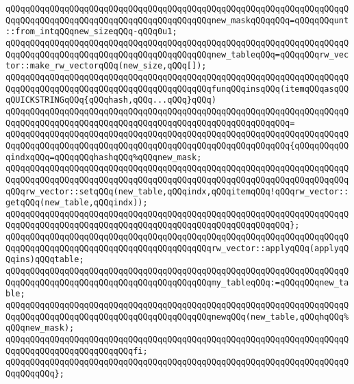 \verb|qQQqqQQqqQQqqQQqqQQqqQQqqQQqqQQqqQQqqQQqqQQqqQQqqQQqqQQqqQQqqQQqqQQqqQQqqQQqqQQqqQQqqQQqqQQqqQQqqQQqqQQqqQQqqQQqnew_maskqQQqqQQq=qQQqqQQqunt::from_intqQQqnew_sizeqQQq-qQQq0u1;|\newline
\verb|qQQqqQQqqQQqqQQqqQQqqQQqqQQqqQQqqQQqqQQqqQQqqQQqqQQqqQQqqQQqqQQqqQQqqQQqqQQqqQQqqQQqqQQqqQQqqQQqqQQqqQQqqQQqqQQqnew_tableqQQq=qQQqqQQqrw_vector::make_rw_vectorqQQq(new_size,qQQq[]);|\newline
\newline
\verb|qQQqqQQqqQQqqQQqqQQqqQQqqQQqqQQqqQQqqQQqqQQqqQQqqQQqqQQqqQQqqQQqqQQqqQQqqQQqqQQqqQQqqQQqqQQqqQQqqQQqqQQqqQQqqQQqfunqQQqinsqQQq(itemqQQqasqQQqQUICKSTRINGqQQq{qQQqhash,qQQq...qQQq}qQQq)|\newline
\verb|qQQqqQQqqQQqqQQqqQQqqQQqqQQqqQQqqQQqqQQqqQQqqQQqqQQqqQQqqQQqqQQqqQQqqQQqqQQqqQQqqQQqqQQqqQQqqQQqqQQqqQQqqQQqqQQqqQQqqQQqqQQqqQQq=|\newline
\verb|qQQqqQQqqQQqqQQqqQQqqQQqqQQqqQQqqQQqqQQqqQQqqQQqqQQqqQQqqQQqqQQqqQQqqQQqqQQqqQQqqQQqqQQqqQQqqQQqqQQqqQQqqQQqqQQqqQQqqQQqqQQqqQQq{qQQqqQQqqQQqindxqQQq=qQQqqQQqhashqQQq%qQQqnew_mask;|\newline
\newline
\verb|qQQqqQQqqQQqqQQqqQQqqQQqqQQqqQQqqQQqqQQqqQQqqQQqqQQqqQQqqQQqqQQqqQQqqQQqqQQqqQQqqQQqqQQqqQQqqQQqqQQqqQQqqQQqqQQqqQQqqQQqqQQqqQQqqQQqqQQqqQQqqQQqrw_vector::setqQQq(new_table,qQQqindx,qQQqitemqQQq!qQQqrw_vector::getqQQq(new_table,qQQqindx));|\newline
\verb|qQQqqQQqqQQqqQQqqQQqqQQqqQQqqQQqqQQqqQQqqQQqqQQqqQQqqQQqqQQqqQQqqQQqqQQqqQQqqQQqqQQqqQQqqQQqqQQqqQQqqQQqqQQqqQQqqQQqqQQqqQQqqQQq};|\newline
\newline
\verb|qQQqqQQqqQQqqQQqqQQqqQQqqQQqqQQqqQQqqQQqqQQqqQQqqQQqqQQqqQQqqQQqqQQqqQQqqQQqqQQqqQQqqQQqqQQqqQQqqQQqqQQqqQQqqQQqrw_vector::applyqQQq(applyqQQqins)qQQqtable;|\newline
\verb|qQQqqQQqqQQqqQQqqQQqqQQqqQQqqQQqqQQqqQQqqQQqqQQqqQQqqQQqqQQqqQQqqQQqqQQqqQQqqQQqqQQqqQQqqQQqqQQqqQQqqQQqqQQqqQQqmy_tableqQQq:=qQQqqQQqnew_table;|\newline
\verb|qQQqqQQqqQQqqQQqqQQqqQQqqQQqqQQqqQQqqQQqqQQqqQQqqQQqqQQqqQQqqQQqqQQqqQQqqQQqqQQqqQQqqQQqqQQqqQQqqQQqqQQqqQQqqQQqnewqQQq(new_table,qQQqhqQQq%qQQqnew_mask);|\newline
\verb|qQQqqQQqqQQqqQQqqQQqqQQqqQQqqQQqqQQqqQQqqQQqqQQqqQQqqQQqqQQqqQQqqQQqqQQqqQQqqQQqqQQqqQQqqQQqqQQqfi;|\newline
\verb|qQQqqQQqqQQqqQQqqQQqqQQqqQQqqQQqqQQqqQQqqQQqqQQqqQQqqQQqqQQqqQQqqQQqqQQqqQQqqQQq};|\newline
